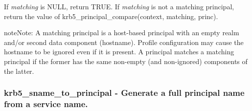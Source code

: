 \documentclass[letterpaper,10pt,english]{sphinxmanual}
\begin{document}
If \emph{matching} is NULL, return TRUE. If \emph{matching} is not a matching principal, return the value of krb5\_principal\_compare(context, matching, princ).

\begin{notice}{note}{Note:}
A matching principal is a host-based principal with an empty realm and/or second data component (hostname). Profile configuration may cause the hostname to be ignored even if it is present. A principal matches a matching principal if the former has the same non-empty (and non-ignored) components of the latter.
\end{notice}


\subsubsection{krb5\_sname\_to\_principal -  Generate a full principal name from a service name.}
\label{appdev/refs/api/krb5_sname_to_principal:krb5-sname-to-principal-generate-a-full-principal-name-from-a-service-name}\label{appdev/refs/api/krb5_sname_to_principal::doc}

\begin{fulllineitems}
\label{appdev/refs/api/krb5_sname_to_principal:c.krb5_sname_to_principal}
\end{fulllineitems}
\end{document}
